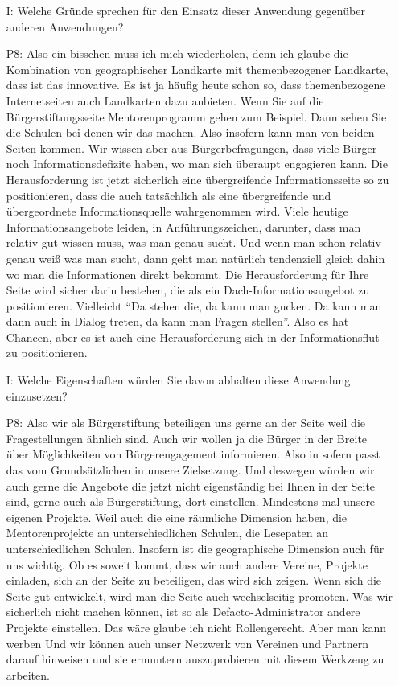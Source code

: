 \begin{itemize}
    \item[I:] Welche Gr{\"u}nde sprechen f{\"u}r den Einsatz dieser Anwendung gegen{\"u}ber anderen Anwendungen?
    \item[P8:] Also ein bisschen muss ich mich wiederholen, denn ich glaube die Kombination von geographischer Landkarte mit themenbezogener Landkarte, dass ist das innovative. Es ist ja h{\"a}ufig heute schon so, dass themenbezogene Internetseiten auch Landkarten dazu anbieten. Wenn Sie auf die B{\"u}rgerstiftungsseite Mentorenprogramm gehen zum Beispiel. Dann sehen Sie die Schulen bei denen wir das machen. Also insofern kann man von beiden Seiten kommen. Wir wissen aber aus B{\"u}rgerbefragungen, dass viele B{\"u}rger noch Informationsdefizite haben, wo man sich {\"u}beraupt engagieren kann. Die Herausforderung ist jetzt sicherlich eine {\"u}bergreifende Informationsseite so zu positionieren, dass die auch tats{\"a}chlich als eine {\"u}bergreifende und {\"u}bergeordnete Informationsquelle wahrgenommen wird. Viele heutige Informationsangebote leiden, in Anf{\"u}hrungszeichen, darunter, dass man relativ gut wissen muss, was man genau sucht. Und wenn man schon relativ genau wei{\ss} was man sucht, dann geht man nat{\"u}rlich tendenziell gleich dahin wo man die Informationen direkt bekommt. Die Herausforderung f{\"u}r Ihre Seite wird sicher darin bestehen, die als ein Dach-Informationsangebot zu positionieren. Vielleicht "`Da stehen die, da kann man gucken. Da kann man dann auch in Dialog treten, da kann man Fragen stellen"'. Also es hat Chancen, aber es ist auch eine Herausforderung sich in der Informationsflut zu positionieren.
    \item[I:] Welche Eigenschaften w{\"u}rden Sie davon abhalten diese Anwendung einzusetzen?
    \item[P8:] Also wir als B{\"u}rgerstiftung beteiligen uns gerne an der Seite weil die Fragestellungen {\"a}hnlich sind. Auch wir wollen ja die B{\"u}rger in der Breite {\"u}ber M{\"o}glichkeiten von B{\"u}rgerengagement informieren. Also in sofern passt das vom Grunds{\"a}tzlichen in unsere Zielsetzung. Und deswegen w{\"u}rden wir auch gerne die Angebote die jetzt nicht eigenst{\"a}ndig bei Ihnen in der Seite sind, gerne auch als B{\"u}rgerstiftung, dort einstellen. Mindestens mal unsere eigenen Projekte. Weil auch die eine r{\"a}umliche Dimension haben, die Mentorenprojekte an unterschiedlichen Schulen, die Lesepaten an unterschiedlichen Schulen. Insofern ist die geographische Dimension auch f{\"u}r uns wichtig. Ob es soweit kommt, dass wir auch andere Vereine, Projekte einladen, sich an der Seite zu beteiligen, das wird sich zeigen. Wenn sich die Seite gut entwickelt, wird man die Seite auch wechselseitig promoten. Was wir sicherlich nicht machen k{\"o}nnen, ist so als Defacto-Administrator andere Projekte einstellen. Das w{\"a}re glaube ich nicht Rollengerecht. Aber man kann werben Und wir k{\"o}nnen auch unser Netzwerk von Vereinen und Partnern darauf hinweisen und sie ermuntern auszuprobieren mit diesem Werkzeug zu arbeiten.

\end{itemize}
